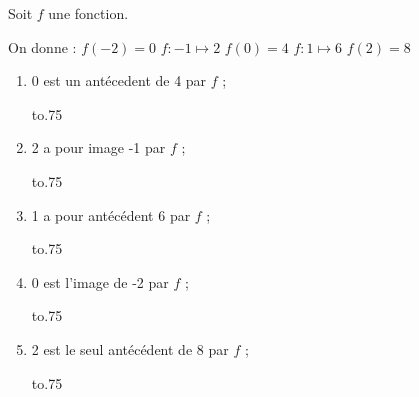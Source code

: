 \documentclass[exercice]{thedocument}%
\begin{document}
%
Soit $f$ une fonction.\par\smallskip\noindent On donne :\qquad
$f(-2)=0$\qquad
$f:-1\mapsto2$\qquad
$f(0)=4$\qquad
$f:1\mapsto6$\qquad
$f(2)=8$\qquad
\begin{enumerate}
    \item 0 est un antécedent de 4 par $f$ ;\par\noindent\hbox to.75\linewidth{$\square$\quad VRAI\hfill$\square$\quad FAUX\hfill$\square$\quad On ne peut pas savoir}
    \item 2 a pour image -1 par $f$ ;\par\noindent\hbox to.75\linewidth{$\square$\quad VRAI\hfill$\square$\quad FAUX\hfill$\square$\quad On ne peut pas savoir}
    \item 1 a pour antécédent 6 par $f$ ;\par\noindent\hbox to.75\linewidth{$\square$\quad VRAI\hfill$\square$\quad FAUX\hfill$\square$\quad On ne peut pas savoir}
    \item 0 est l'image de -2 par $f$ ;\par\noindent\hbox to.75\linewidth{$\square$\quad VRAI\hfill$\square$\quad FAUX\hfill$\square$\quad On ne peut pas savoir}
    \item 2 est le seul antécédent de 8 par $f$ ;\par\noindent\hbox to.75\linewidth{$\square$\quad VRAI\hfill$\square$\quad FAUX\hfill$\square$\quad On ne peut pas savoir}
\end{enumerate}
\end{document}
